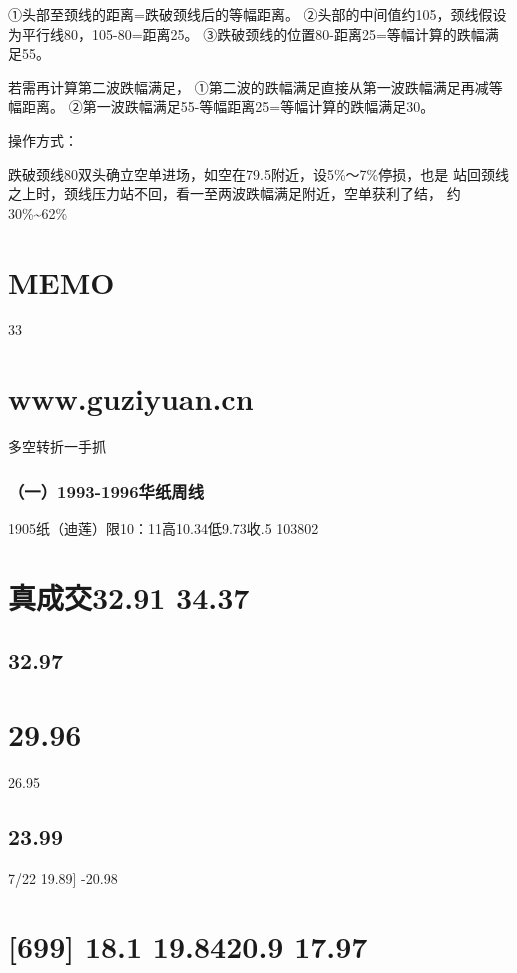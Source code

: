 \documentclass{article}
\begin{document}
①头部至颈线的距离=跌破颈线后的等幅距离。 ②头部的中间值约105，颈线假设为平行线80，105-80=距离25。 ③跌破颈线的位置80-距离25=等幅计算的跌幅满足55。

若需再计算第二波跌幅满足， ①第二波的跌幅满足直接从第一波跌幅满足再减等幅距离。 ②第一波跌幅满足55-等幅距离25=等幅计算的跌幅满足30。

操作方式：

跌破颈线80双头确立空单进场，如空在79.5附近，设5\%～7\%停损，也是 站回颈线之上时，颈线压力站不回，看一至两波跌幅满足附近，空单获利了结， 约30\%\textasciitilde{}62\%

\section{MEMO}

33

\clearpage

\section{www.guziyuan.cn}

多空转折一手抓

\subsubsection{（一）1993-1996华纸周线}

1905纸（迪莲）限10：11高10.34低9.73收.5 103802

\section{真成交32.91 34.37}

\subsection{32.97}

\section{29.96}

26.95

\subsection{23.99}

7/22 19.89] -20.98

\section{[699] 18.1 19.8420.9 17.97}
\end{document}
